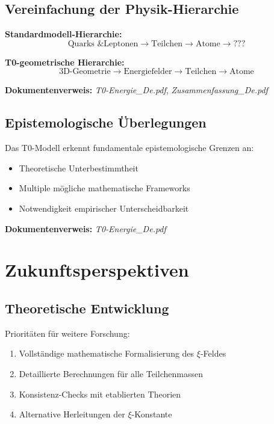 \documentclass[12pt,a4paper]{article}
\newcommand{\xipar}{\xi}
\begin{document}
	\subsection{Vereinfachung der Physik-Hierarchie}
	
	\textbf{Standardmodell-Hierarchie:}
	\begin{equation}
		\text{Quarks \& Leptonen} \rightarrow \text{Teilchen} \rightarrow \text{Atome} \rightarrow \text{???}
	\end{equation}
	
	\textbf{T0-geometrische Hierarchie:}
	\begin{equation}
		\text{3D-Geometrie} \rightarrow \text{Energiefelder} \rightarrow \text{Teilchen} \rightarrow \text{Atome}
	\end{equation}
	
	\textbf{Dokumentenverweis:} \textit{T0-Energie\_De.pdf}, \textit{Zusammenfassung\_De.pdf}
	
	\subsection{Epistemologische Überlegungen}
	
	Das T0-Modell erkennt fundamentale epistemologische Grenzen an:
	\begin{itemize}
		\item Theoretische Unterbestimmtheit
		\item Multiple mögliche mathematische Frameworks
		\item Notwendigkeit empirischer Unterscheidbarkeit
	\end{itemize}
	
	\textbf{Dokumentenverweis:} \textit{T0-Energie\_De.pdf}
	
	\section{Zukunftsperspektiven}
	
	\subsection{Theoretische Entwicklung}
	
	Prioritäten für weitere Forschung:
	
	\begin{enumerate}
		\item Vollständige mathematische Formalisierung des $\xipar$-Feldes
		\item Detaillierte Berechnungen für alle Teilchenmassen
		\item Konsistenz-Checks mit etablierten Theorien
		\item Alternative Herleitungen der $\xipar$-Konstante
	\end{enumerate}
	
\end{document}
